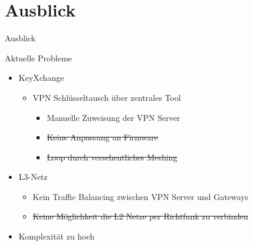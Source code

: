 \section{Ausblick}
\begin{frame}{}
    \begin{center}
        Ausblick
     \end{center}
\end{frame}

\begin{frame}{Aktuelle Probleme}
    \begin{itemize}
        \item KeyXchange
        \begin{itemize}
            \item VPN Schlüsseltausch über zentrales Tool
            \begin{itemize}
                \item Manuelle Zuweisung der VPN Server
                \item \sout{Keine Anpassung an Firmware}
                \item \sout{Loop durch versehentliches Meshing}
            \end{itemize}
        \end{itemize}
        \item L3-Netz
        \begin{itemize}
            \item Kein Traffic Balancing zwischen VPN Server und Gateways
            \item \sout{Keine Möglichkeit die L2 Netze per Richtfunk zu verbinden}
        \end{itemize}
        \item Komplexität zu hoch
    \end{itemize}
\end{frame}

